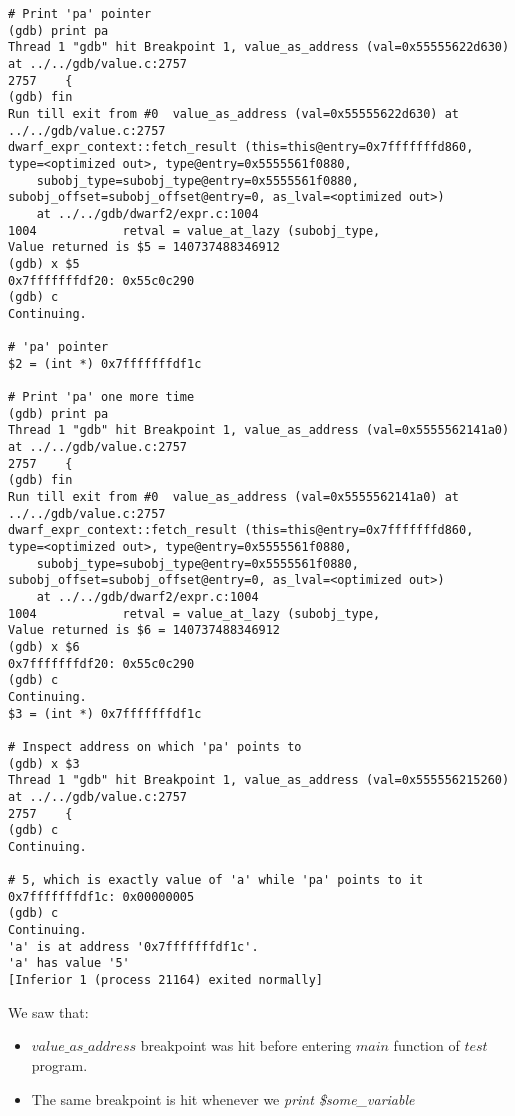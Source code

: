 \documentclass{report}
\begin{document}
\begin{verbatim}
# Print 'pa' pointer
(gdb) print pa
Thread 1 "gdb" hit Breakpoint 1, value_as_address (val=0x55555622d630) at ../../gdb/value.c:2757
2757	{
(gdb) fin
Run till exit from #0  value_as_address (val=0x55555622d630) at ../../gdb/value.c:2757
dwarf_expr_context::fetch_result (this=this@entry=0x7fffffffd860, type=<optimized out>, type@entry=0x5555561f0880, 
    subobj_type=subobj_type@entry=0x5555561f0880, subobj_offset=subobj_offset@entry=0, as_lval=<optimized out>)
    at ../../gdb/dwarf2/expr.c:1004
1004		    retval = value_at_lazy (subobj_type,
Value returned is $5 = 140737488346912
(gdb) x $5
0x7fffffffdf20:	0x55c0c290
(gdb) c
Continuing.

# 'pa' pointer
$2 = (int *) 0x7fffffffdf1c

# Print 'pa' one more time
(gdb) print pa
Thread 1 "gdb" hit Breakpoint 1, value_as_address (val=0x5555562141a0) at ../../gdb/value.c:2757
2757	{
(gdb) fin
Run till exit from #0  value_as_address (val=0x5555562141a0) at ../../gdb/value.c:2757
dwarf_expr_context::fetch_result (this=this@entry=0x7fffffffd860, type=<optimized out>, type@entry=0x5555561f0880, 
    subobj_type=subobj_type@entry=0x5555561f0880, subobj_offset=subobj_offset@entry=0, as_lval=<optimized out>)
    at ../../gdb/dwarf2/expr.c:1004
1004		    retval = value_at_lazy (subobj_type,
Value returned is $6 = 140737488346912
(gdb) x $6
0x7fffffffdf20:	0x55c0c290
(gdb) c
Continuing.
$3 = (int *) 0x7fffffffdf1c

# Inspect address on which 'pa' points to
(gdb) x $3
Thread 1 "gdb" hit Breakpoint 1, value_as_address (val=0x555556215260) at ../../gdb/value.c:2757
2757	{
(gdb) c
Continuing.

# 5, which is exactly value of 'a' while 'pa' points to it
0x7fffffffdf1c:	0x00000005
(gdb) c
Continuing.
'a' is at address '0x7fffffffdf1c'.
'a' has value '5'
[Inferior 1 (process 21164) exited normally]

\end{verbatim}
We saw that:
\begin{itemize}
\item $value\_as\_address$ breakpoint was hit before entering $main$ function of $test$ program.
\item The same breakpoint is hit whenever we \textit{print \$some\_variable}
\end{itemize}
\end{document}
